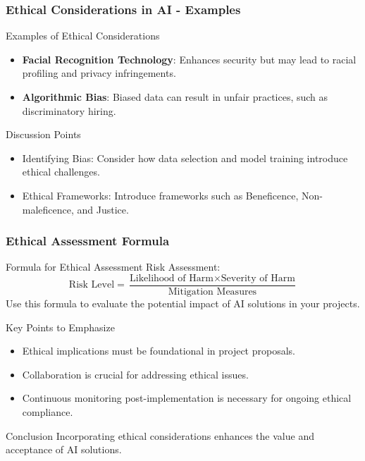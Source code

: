 \documentclass[aspectratio=169]{beamer}
\begin{document}
\begin{frame}[fragile]
    \frametitle{Ethical Considerations in AI - Examples}
    \begin{block}{Examples of Ethical Considerations}
        \begin{itemize}
            \item \textbf{Facial Recognition Technology}: Enhances security but may lead to racial profiling and privacy infringements.
            \item \textbf{Algorithmic Bias}: Biased data can result in unfair practices, such as discriminatory hiring.
        \end{itemize}
    \end{block}
    
    \begin{block}{Discussion Points}
        \begin{itemize}
            \item Identifying Bias: Consider how data selection and model training introduce ethical challenges.
            \item Ethical Frameworks: Introduce frameworks such as Beneficence, Non-maleficence, and Justice.
        \end{itemize}
    \end{block}
\end{frame}

\begin{frame}[fragile]
    \frametitle{Ethical Assessment Formula}
    \begin{block}{Formula for Ethical Assessment}
        Risk Assessment:
        \begin{equation}
            \text{Risk Level} = \frac{\text{Likelihood of Harm} \times \text{Severity of Harm}}{\text{Mitigation Measures}}
        \end{equation}
        Use this formula to evaluate the potential impact of AI solutions in your projects.
    \end{block}
    
    \begin{block}{Key Points to Emphasize}
        \begin{itemize}
            \item Ethical implications must be foundational in project proposals.
            \item Collaboration is crucial for addressing ethical issues.
            \item Continuous monitoring post-implementation is necessary for ongoing ethical compliance.
        \end{itemize}
    \end{block}
    
    \begin{block}{Conclusion}
        Incorporating ethical considerations enhances the value and acceptance of AI solutions.
    \end{block}
\end{frame}
\end{document}
